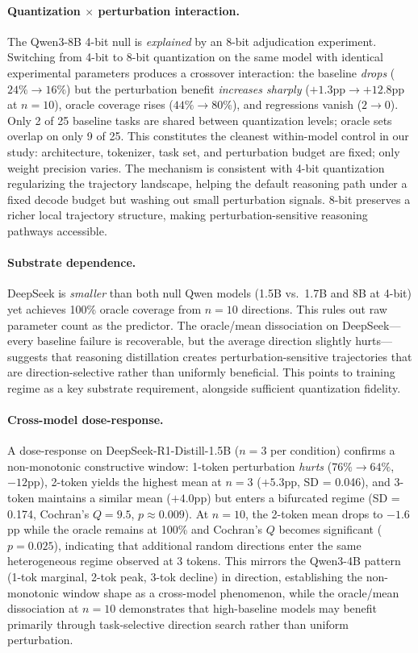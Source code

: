 \documentclass{article}
\begin{document}
\paragraph{Quantization $\times$ perturbation interaction.}
The Qwen3-8B 4-bit null is \emph{explained} by an 8-bit adjudication
experiment. Switching from 4-bit to 8-bit quantization on the same model
with identical experimental parameters produces a crossover interaction:
the baseline \emph{drops} ($24\% \to 16\%$) but the perturbation benefit
\emph{increases sharply} ($+1.3\text{pp} \to +12.8\text{pp}$ at $n{=}10$),
oracle coverage rises ($44\% \to 80\%$), and regressions vanish ($2 \to 0$).
Only 2 of 25 baseline tasks are shared between quantization levels;
oracle sets overlap on only 9 of 25.
This constitutes the cleanest within-model control in our study:
architecture, tokenizer, task set, and perturbation budget are fixed;
only weight precision varies.
The mechanism is consistent with 4-bit quantization regularizing
the trajectory landscape, helping the default reasoning path under
a fixed decode budget but washing out small perturbation signals.
8-bit preserves a richer local trajectory structure, making
perturbation-sensitive reasoning pathways accessible.

\paragraph{Substrate dependence.}
DeepSeek is \emph{smaller} than both null Qwen models (1.5B
vs.\ 1.7B and 8B at 4-bit) yet achieves 100\% oracle coverage
from $n{=}10$ directions. This rules out raw parameter count as the
predictor. The oracle/mean dissociation on DeepSeek---every baseline
failure is recoverable, but the average direction slightly
hurts---suggests that reasoning distillation creates perturbation-sensitive
trajectories that are direction-selective rather than uniformly beneficial.
This points to training regime as a key substrate requirement, alongside
sufficient quantization fidelity.

\paragraph{Cross-model dose-response.}
A dose-response on DeepSeek-R1-Distill-1.5B ($n{=}3$ per condition)
confirms a non-monotonic constructive window: 1-token perturbation
\emph{hurts} ($76\% \to 64\%$, $-12\text{pp}$), 2-token yields
the highest mean at $n{=}3$ ($+5.3\text{pp}$, SD = 0.046), and
3-token maintains a similar mean ($+4.0\text{pp}$) but enters a
bifurcated regime (SD = 0.174, Cochran's $Q = 9.5$, $p \approx
0.009$). At $n{=}10$, the 2-token mean drops to $-1.6$pp while
the oracle remains at 100\% and Cochran's $Q$ becomes significant
($p = 0.025$), indicating that additional random directions enter
the same heterogeneous regime observed at 3 tokens. This mirrors the
Qwen3-4B pattern (1-tok marginal, 2-tok peak, 3-tok decline) in
direction, establishing the non-monotonic window shape as a
cross-model phenomenon, while the oracle/mean dissociation at $n{=}10$
demonstrates that high-baseline models may benefit primarily through
task-selective direction search rather than uniform perturbation.
\end{document}
